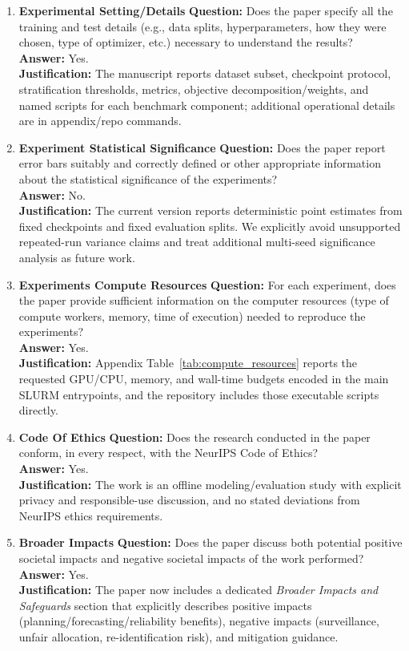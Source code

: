 \begin{enumerate}
\item \textbf{Experimental Setting/Details}
\textbf{Question:} Does the paper specify all the training and test details (e.g., data splits, hyperparameters, how they were chosen, type of optimizer, etc.) necessary to understand the results?\\
\textbf{Answer:} Yes.\\
\textbf{Justification:} The manuscript reports dataset subset, checkpoint protocol, stratification thresholds, metrics, objective decomposition/weights, and named scripts for each benchmark component; additional operational details are in appendix/repo commands.

\item \textbf{Experiment Statistical Significance}
\textbf{Question:} Does the paper report error bars suitably and correctly defined or other appropriate information about the statistical significance of the experiments?\\
\textbf{Answer:} No.\\
\textbf{Justification:} The current version reports deterministic point estimates from fixed checkpoints and fixed evaluation splits. We explicitly avoid unsupported repeated-run variance claims and treat additional multi-seed significance analysis as future work.

\item \textbf{Experiments Compute Resources}
\textbf{Question:} For each experiment, does the paper provide sufficient information on the computer resources (type of compute workers, memory, time of execution) needed to reproduce the experiments?\\
\textbf{Answer:} Yes.\\
\textbf{Justification:} Appendix Table~\ref{tab:compute_resources} reports the requested GPU/CPU, memory, and wall-time budgets encoded in the main SLURM entrypoints, and the repository includes those executable scripts directly.

\item \textbf{Code Of Ethics}
\textbf{Question:} Does the research conducted in the paper conform, in every respect, with the NeurIPS Code of Ethics?\\
\textbf{Answer:} Yes.\\
\textbf{Justification:} The work is an offline modeling/evaluation study with explicit privacy and responsible-use discussion, and no stated deviations from NeurIPS ethics requirements.

\item \textbf{Broader Impacts}
\textbf{Question:} Does the paper discuss both potential positive societal impacts and negative societal impacts of the work performed?\\
\textbf{Answer:} Yes.\\
\textbf{Justification:} The paper now includes a dedicated \emph{Broader Impacts and Safeguards} section that explicitly describes positive impacts (planning/forecasting/reliability benefits), negative impacts (surveillance, unfair allocation, re-identification risk), and mitigation guidance.


\end{enumerate}
